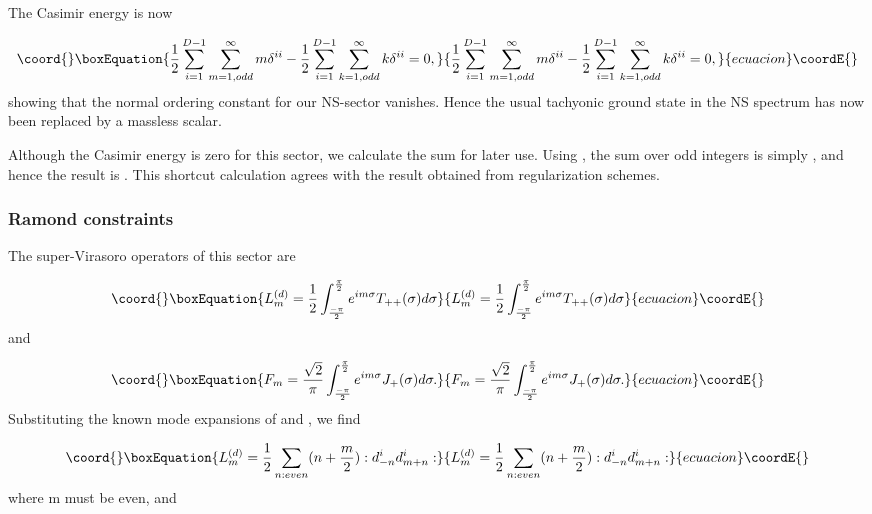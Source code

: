 \documentclass[a4paper,a4paper]{article}
\begin{document}
The Casimir energy is now

\begin{equation}\coord{}\boxEquation{
\frac{1}{2}\sum_{i=1}^{D-1}\sum_{m=1,odd}^{\infty}m
\delta^{ii}-\frac{1}{2}\sum_{i=1}^{D-1}\sum_{k=1,odd}^{\infty}k\delta^{ii}=0,
}{
\frac{1}{2}\sum_{i=1}^{D-1}\sum_{m=1,odd}^{\infty}m
\delta^{ii}-\frac{1}{2}\sum_{i=1}^{D-1}\sum_{k=1,odd}^{\infty}k\delta^{ii}=0,
}{ecuacion}\coordE{}\end{equation}
showing that the normal ordering constant for our NS-sector
vanishes. Hence the usual tachyonic ground state in the NS
spectrum has now been replaced by a massless scalar.

Although the Casimir energy is zero for this sector, we calculate
the sum \coordHE{} for
later use.  Using \coordHE{}, the sum over odd
integers is simply \coordHE{}, and hence
the result is \coordHE{}.  This shortcut calculation agrees
with the result obtained from regularization schemes.

\subsubsection{Ramond constraints}

The super-Virasoro operators of this sector  are

\begin{equation}\coord{}\boxEquation{
L_{m}^{(d)}=\frac{1}{2}\int_{\frac{-\pi}{2}}^{\frac{\pi}{2}}e^{im\sigma}T_{++}(\sigma)d\sigma
}{
L_{m}^{(d)}=\frac{1}{2}\int_{\frac{-\pi}{2}}^{\frac{\pi}{2}}e^{im\sigma}T_{++}(\sigma)d\sigma
}{ecuacion}\coordE{}\end{equation}
and

\begin{equation}\coord{}\boxEquation{
F_{m}=\frac{\sqrt{2}}{\pi}\int_{\frac{-\pi}{2}}^{\frac{\pi}{2}}e^{im\sigma}J_{+}(\sigma)d\sigma.
}{
F_{m}=\frac{\sqrt{2}}{\pi}\int_{\frac{-\pi}{2}}^{\frac{\pi}{2}}e^{im\sigma}J_{+}(\sigma)d\sigma.
}{ecuacion}\coordE{}\end{equation}
Substituting the known mode expansions of \coordHE{} and \coordHE{}, we
find

\begin{equation}\coord{}\boxEquation{
L_{m}^{(d)}=\frac{1}{2}\sum_{n:even}(n+\frac{m}{2}):d_{-n}^{i}d_{m+n}^{i}:
}{
L_{m}^{(d)}=\frac{1}{2}\sum_{n:even}(n+\frac{m}{2}):d_{-n}^{i}d_{m+n}^{i}:
}{ecuacion}\coordE{}\end{equation}
where m must be even, and
\end{document}
